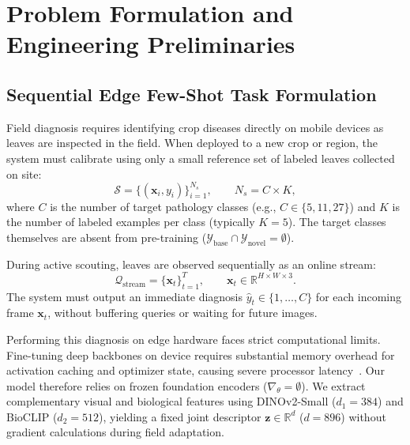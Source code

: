 \section{Problem Formulation and Engineering Preliminaries}
\label{sec:problem_formulation}

\subsection{Sequential Edge Few-Shot Task Formulation}
\label{sec:task_formulation}
Field diagnosis requires identifying crop diseases directly on mobile devices as leaves are inspected in the field. When deployed to a new crop or region, the system must calibrate using only a small reference set of labeled leaves collected on site:
\begin{equation}
    \mathcal{S} = \{(\mathbf{x}_i, y_i)\}_{i=1}^{N_s}, \qquad N_s = C \times K,
\end{equation}
where $C$ is the number of target pathology classes (e.g., $C \in \{5, 11, 27\}$) and $K$ is the number of labeled examples per class (typically $K = 5$). The target classes themselves are absent from pre-training ($\mathcal{Y}_{\text{base}} \cap \mathcal{Y}_{\text{novel}} = \emptyset$).

During active scouting, leaves are observed sequentially as an online stream:
\begin{equation}
    \mathcal{Q}_{\text{stream}} = \{\mathbf{x}_t\}_{t=1}^{T}, \qquad \mathbf{x}_t \in \mathbb{R}^{H \times W \times 3}.
\end{equation}
The system must output an immediate diagnosis $\hat{y}_t \in \{1, \dots, C\}$ for each incoming frame $\mathbf{x}_t$, without buffering queries or waiting for future images.

Performing this diagnosis on edge hardware faces strict computational limits. Fine-tuning deep backbones on device requires substantial memory overhead for activation caching and optimizer state, causing severe processor latency~\cite{lin2022device,radocaj2025evolution}. Our model therefore relies on frozen foundation encoders ($\nabla_\theta = \emptyset$). We extract complementary visual and biological features using DINOv2-Small ($d_1 = 384$) and BioCLIP ($d_2 = 512$), yielding a fixed joint descriptor $\mathbf{z} \in \mathbb{R}^d$ ($d = 896$) without gradient calculations during field adaptation.

